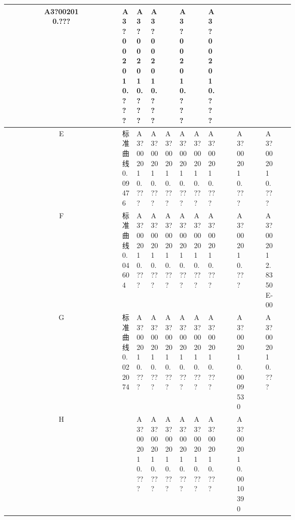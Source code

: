 \documentclass[UTF8,10pt,a4paper,fontset=fandol]{ctexart}
\begin{document}
\begin{center}
\begin{tabular}{c|*{12}{p{0.055\linewidth}|}}
\shortstack{A3?00201\\0.???} &
\shortstack{A3?00201\\0.???} &
\shortstack{A3?00201\\0.???} &
\shortstack{A3?00201\\0.???} &
 &
\shortstack{A3?00201\\0.???} &
 &
\shortstack{A3?00201\\0.???} &
\\ \hline
E &
\shortstack{标准曲线\\0.09476} &
\shortstack{A3?00201\\0.???} &
\shortstack{A3?00201\\0.???} &
\shortstack{A3?00201\\0.???} &
\shortstack{A3?00201\\0.???} &
\shortstack{A3?00201\\0.???} &
\shortstack{A3?00201\\0.???} &
 &
\shortstack{A3?00201\\0.???} &
 &
\shortstack{A3?00201\\0.???} &
\\ \hline
F &
\shortstack{标准曲线\\0.04604} &
\shortstack{A3?00201\\0.???} &
\shortstack{A3?00201\\0.???} &
\shortstack{A3?00201\\0.???} &
\shortstack{A3?00201\\0.???} &
\shortstack{A3?00201\\0.???} &
\shortstack{A3?00201\\0.???} &
 &
\shortstack{A3?00201\\0.???} &
 &
\shortstack{A3?00201\\2.8350E-00} &
\\ \hline
G &
\shortstack{标准曲线\\0.022074} &
\shortstack{A3?00201\\0.???} &
\shortstack{A3?00201\\0.???} &
\shortstack{A3?00201\\0.???} &
\shortstack{A3?00201\\0.???} &
\shortstack{A3?00201\\0.???} &
\shortstack{A3?00201\\0.???} &
 &
\shortstack{A3?00201\\0.0009530} &
 &
\shortstack{A3?00201\\0.???} &
\\ \hline
H &
 &
\shortstack{A3?00201\\0.???} &
\shortstack{A3?00201\\0.???} &
\shortstack{A3?00201\\0.???} &
\shortstack{A3?00201\\0.???} &
\shortstack{A3?00201\\0.???} &
\shortstack{A3?00201\\0.???} &
 &
\shortstack{A3?00201\\0.0010390} &
 &
 &
\end{tabular}
\end{center}
\end{document}
